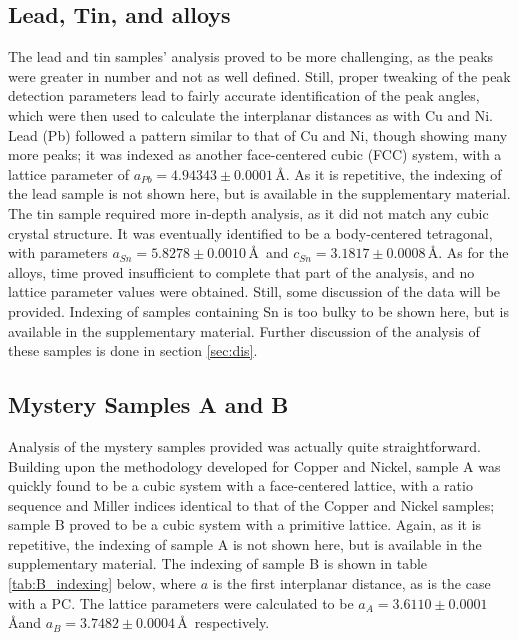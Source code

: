 \documentclass[12pt]{article}
\begin{document}
\subsection{Lead, Tin, and alloys}
The lead and tin samples' analysis proved to be more challenging, as the peaks were greater in number and not as well defined. Still, proper tweaking of the  peak detection
parameters lead to fairly accurate identification of the peak angles, which were then used to calculate the interplanar distances as with Cu and Ni. Lead (Pb) followed a
pattern similar to that of Cu and Ni, though showing many more peaks; it was indexed as another face-centered cubic (FCC) system, with a lattice parameter of $a_{Pb}=4.94343\pm 0.0001$\,\AA.
As it is repetitive, the indexing of the lead sample is not shown here, but is available in the supplementary material. The tin sample required more in-depth analysis,
as it did not match any cubic crystal structure. It was eventually identified to be a body-centered tetragonal, with parameters $a_{Sn}=5.8278 \pm 0.0010$\,\AA\ and $c_{Sn}=3.1817 \pm 0.0008$\,\AA.
As for the alloys, time proved insufficient to complete that part of the analysis, and no lattice parameter values were obtained. Still, some discussion of the data will be provided. Indexing of
samples containing Sn is too bulky to be shown here, but is available in the supplementary material. Further discussion of the analysis of these samples is done
 in section \ref{sec:dis}.

\subsection{Mystery Samples A and B}
Analysis of the mystery samples provided was actually quite straightforward. Building upon the methodology developed for Copper and Nickel,
sample A was quickly found to be a cubic system with a face-centered lattice, with a ratio sequence and Miller indices identical to that of the Copper
and Nickel samples; sample B proved to be a cubic system with a primitive lattice. Again, as it is repetitive, the indexing of sample A is not shown here, but is
available in the supplementary material. The indexing of sample B is shown in table \ref{tab:B_indexing} below, where $a$ is the first interplanar distance,
as is the case with a PC.
The lattice parameters were calculated to be $a_A=3.6110\pm 0.0001$\,\AA and $a_B=3.7482\pm 0.0004$\,\AA\, respectively.
\end{document}
